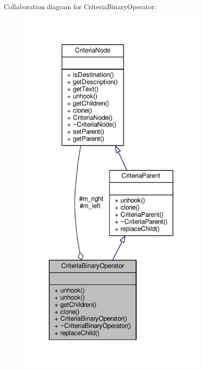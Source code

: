 Collaboration diagram for Criteria\+Binary\+Operator\+:
\nopagebreak
\begin{figure}[H]
\begin{center}
\leavevmode
\includegraphics[width=271pt]{da/db8/classCriteriaBinaryOperator__coll__graph}
\end{center}
\end{figure}
